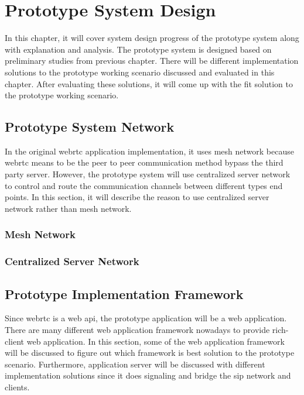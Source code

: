 \chapter{Prototype System Design}
\label{chp:sys_design}

\noindent In this chapter, it will cover system design progress of the prototype system along with explanation and analysis. The prototype system is designed based on preliminary studies from previous chapter. There will be different implementation solutions to the prototype working scenario  discussed and evaluated in this chapter. After evaluating these solutions, it will come up with the fit solution to the prototype working scenario. 

\section{Prototype System Network}

\noindent In the original \gls{webrtc} application implementation, it uses mesh network because \gls{webrtc} means to be the peer to peer communication method bypass the third party server. However, the prototype system will use centralized server network to control and route the communication channels between different types end points. In this section, it will describe the reason to use centralized server network rather than mesh network.

\subsection{Mesh Network}

\subsection{Centralized Server Network}

\section{Prototype Implementation Framework}

\noindent Since \gls{webrtc} is a web \gls{api}, the prototype application will be a web application. There are many different web application framework nowadays to provide rich-client web application. In this section, some of the web application framework will be discussed to figure out which framework is best solution to the prototype scenario. Furthermore, application server will be discussed with different implementation solutions since it does signaling and bridge the \gls{sip} network and clients.

